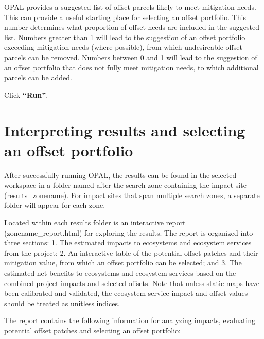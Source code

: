 \documentclass[11pt,letterpaper]{report}
\newenvironment{myenumerate}{%
	\edef\backupindent{\the\parindent}
	\enumerate
	\setlength{\parindent}{\backupindent}
		\setlist[enumerate,1]{label=(\arabic*)}
		\setlist[enumerate,2]{label=(\arabic*)}
}{\endenumerate}
\begin{document}
\begin{myenumerate}
			OPAL provides a suggested list of offset parcels likely to meet mitigation needs. This can provide a useful starting place for selecting an offset portfolio. This number determines what proportion of offset needs are included in the suggested list. Numbers greater than 1 will lead to the suggestion of an offset portfolio exceeding mitigation needs (where possible), from which undesireable offset parcels can be removed. Numbers between 0 and 1 will lead to the suggestion of an offset portfolio that does not fully meet mitigation needs, to which additional parcels can be added.
			
		\item Click \textbf{``Run''}.		
		
	\end{myenumerate}

\chapter{Interpreting results and selecting an offset portfolio}

	After successfully running OPAL, the results can be found in the selected workspace in a folder named after the search zone containing the impact site (results\_{}zonename). For impact sites that span multiple search zones, a separate folder will appear for each zone.  
	
	Located within each results folder is an interactive report (zonename\_{}report.html) for exploring the results. The report is organized into three sections: 1. The estimated impacts to ecosystems and ecosystem services from the project; 2. An interactive table of the potential offset patches and their mitigation value, from which an offset portfolio can be selected; and 3. The estimated net benefits to ecosystems and ecosystem services based on the combined project impacts and selected offsets. Note that unless static maps have been calibrated and validated, the ecosystem service impact and offset values should be treated as unitless indices.
	
	The report contains the following information for analyzing impacts, evaluating potential offset patches and selecting an offset portfolio:
	
\end{document}
